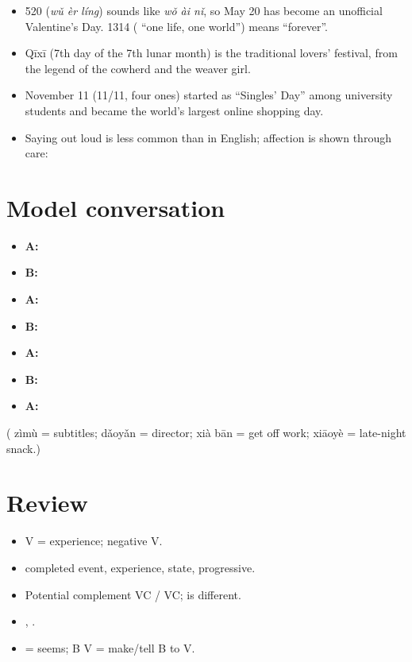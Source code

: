 \begin{aside}
\begin{itemize}
  \item 520 (\emph{wǔ èr líng}) sounds like  \emph{wǒ ài nǐ}, so May 20 has
        become an unofficial Valentine's Day. 1314 ( ``one life, one
        world'') means ``forever''.
  \item {} Qīxī (7th day of the 7th lunar month) is the traditional lovers'
        festival, from the legend of the cowherd and the weaver girl.
  \item November 11 (11/11, four ones) started as  ``Singles' Day'' among
        university students and became the world's largest online shopping day.
  \item Saying  out loud is less common than in English; affection is shown
        through care: 
\end{itemize}
\end{aside}

\section{Model conversation}

\begin{itemize}
  \item \textbf{A:} 
  \item \textbf{B:} 
  \item \textbf{A:} 
  \item \textbf{B:} 
  \item \textbf{A:} 
  \item \textbf{B:} 
  \item \textbf{A:} 
\end{itemize}
( zìmù = subtitles;  dǎoyǎn = director;  xià bān = get off
work;  xiāoyè = late-night snack.)

\section*{Review}
\begin{itemize}
  \item V = experience; negative V.
  \item {} completed event,  experience,  state,  progressive.
  \item Potential complement VC / VC;  is different.
  \item {}, .
  \item {} = seems;  B V = make/tell B to V.
\end{itemize}
